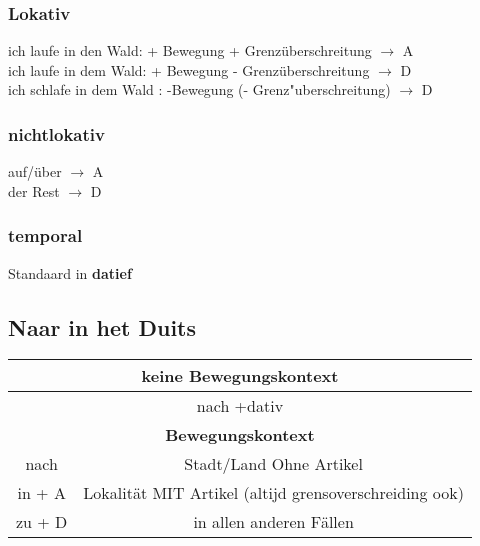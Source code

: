 \documentclass[main.tex]{subfiles}
\begin{document}
\subsubsection{Lokativ}
ich laufe in den Wald: + Bewegung + Grenzüberschreitung $\rightarrow$ A\\
ich laufe in dem Wald: + Bewegung - Grenzüberschreitung $\rightarrow$ D\\
ich schlafe in dem Wald : -Bewegung (- Grenz"uberschreitung) $\rightarrow$ D
\subsubsection{nichtlokativ}
auf/über $\rightarrow$ A\\
der Rest $\rightarrow$ D
\subsubsection{temporal}
Standaard in \textbf{datief}\\


\subsection{Naar in het Duits}
\begin{tabular}{| c | c | c | c |}
\hline
\multicolumn{4}{|c|}{\textbf{keine Bewegungskontext}}\\
\hline
\multicolumn{4}{|c|}{nach +dativ}\\
\hline
\hline
\multicolumn{4}{|c|}{\textbf{Bewegungskontext}}\\
\hline
nach & \multicolumn{3}{|c|}{Stadt/Land Ohne Artikel}\\
\hline
in + A & \multicolumn{3}{|c|}{Lokalität MIT Artikel (altijd grensoverschreiding ook)}\\
\hline
zu + D & \multicolumn{3}{|c|}{in allen anderen Fällen}\\
\hline
\end{tabular}
\end{document}
